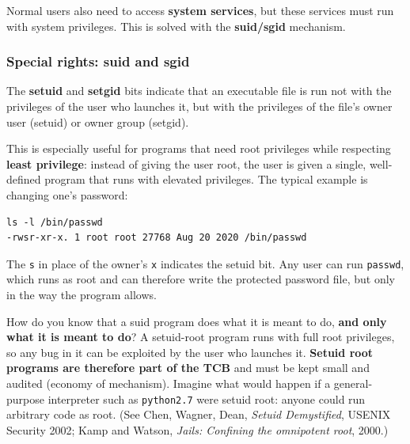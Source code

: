 Normal users also need to access \textbf{system services}, but these services must run with system privileges. This is solved with the \textbf{suid/sgid} mechanism.

\subsubsection{Special rights: suid and sgid}

\begin{definition}
The \textbf{setuid} and \textbf{setgid} bits indicate that an executable file is run not with the privileges of the user who launches it, but with the privileges of the file's owner user (setuid) or owner group (setgid).
\end{definition}

This is especially useful for programs that need root privileges while respecting \textbf{least privilege}: instead of giving the user root, the user is given a single, well-defined program that runs with elevated privileges. The typical example is changing one's password:

\begin{verbatim}
ls -l /bin/passwd
-rwsr-xr-x. 1 root root 27768 Aug 20 2020 /bin/passwd
\end{verbatim}

The \texttt{s} in place of the owner's \texttt{x} indicates the setuid bit. Any user can run \texttt{passwd}, which runs as root and can therefore write the protected password file, but only in the way the program allows.

\begin{remark}
How do you know that a suid program does what it is meant to do, \textbf{and only what it is meant to do}? A setuid-root program runs with full root privileges, so any bug in it can be exploited by the user who launches it. \textbf{Setuid root programs are therefore part of the TCB} and must be kept small and audited (economy of mechanism). Imagine what would happen if a general-purpose interpreter such as \texttt{python2.7} were setuid root: anyone could run arbitrary code as root. (See Chen, Wagner, Dean, \emph{Setuid Demystified}, USENIX Security 2002; Kamp and Watson, \emph{Jails: Confining the omnipotent root}, 2000.)
\end{remark}

